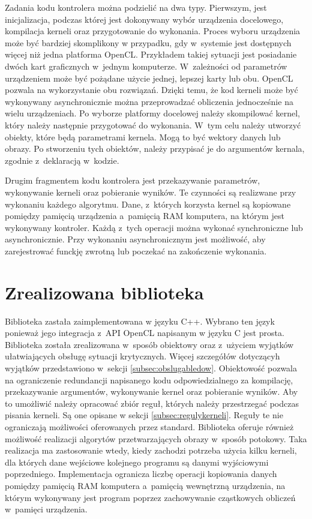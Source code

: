 Zadania kodu kontrolera można podzielić na dwa typy. Pierwszym, jest inicjalizacja, podczas której jest dokonywany wybór urządzenia docelowego, kompilacja kerneli oraz przygotowanie do wykonania. Proces wyboru urządzenia może być bardziej skomplikony w przypadku, gdy w~systemie jest dostępnych więcej niż jedna platforma OpenCL. Przykładem takiej sytuacji jest posiadanie dwóch kart graficznych w~jednym komputerze. W~zależności od parametrów urządzeniem może być pożądane użycie jednej, lepszej karty lub obu. OpenCL pozwala na wykorzystanie obu rozwiązań. Dzięki temu, że kod kerneli może być wykonywany asynchronicznie można przeprowadzać obliczenia jednocześnie na wielu urządzeniach. Po wyborze platformy docelowej należy skompilować kernel, który należy następnie przygotować do wykonania. W~tym celu należy utworzyć obiekty, które będą parametrami kernela. Mogą to być wektory danych lub obrazy. Po stworzeniu tych obiektów, należy przypisać je do argumentów kernala, zgodnie z~deklaracją w~kodzie.

Drugim fragmentem kodu kontrolera jest przekazywanie parametrów, wykonywanie kerneli oraz pobieranie wyników. Te czynności są realizwane przy wykonaniu każdego algorytmu. Dane, z~których korzysta kernel są kopiowane pomiędzy pamięcią urządzenia a~pamięcią RAM komputera, na którym jest wykonywany kontroler. Każdą z~tych operacji można wykonać synchroniczne lub asynchronicznie. Przy wykonaniu asynchronicznym jest możliwość, aby zarejestrować funckję zwrotną lub poczekać na zakończenie wykonania.

\section{Zrealizowana biblioteka}  
\label{sec:biblioteka}

Biblioteka zastała zaimplementowana w języku C++. Wybrano ten język ponieważ jego integracja z~API OpenCL napisanym w języku C jest prosta. Biblioteka została zrealizowana w~sposób obiektowy oraz z~użyciem wyjątków ułatwiających obsługę sytuacji krytycznych. Więcej szczegółów dotyczącyh wyjątków przedstawiono w~sekcji \ref{subsec:obslugabledow}. Obiektowość pozwala na ograniczenie redundancji napisanego kodu odpowiedzialnego za kompilację, przekazywanie argumentów, wykonywanie kernel oraz pobieranie wyników. Aby to umożliwić należy opracować zbiór reguł, których należy przestrzegać podczas pisania kerneli. Są one opisane w sekcji \ref{subsec:regulykerneli}. Reguły te nie ograniczają możliwości oferowanych przez standard. Biblioteka oferuje również możliwość realizacji algorytów przetwarzających obrazy w~sposób potokowy. Taka realizacja ma zastosowanie wtedy, kiedy zachodzi potrzeba użycia kilku kerneli, dla których dane wejściowe kolejnego programu są danymi wyjściowymi poprzedniego. Implementacja  ogranicza liczbę operacji kopiowania danych pomiędzy pamięcią RAM komputera a~pamięcią wewnętrzną urządzenia, na którym wykonywany jest program poprzez zachowywanie cząstkowych obliczeń w~pamięci urządzenia.

